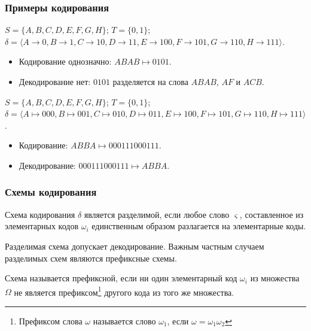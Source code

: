 \begin{frame}
    \frametitle{Примеры кодирования}

    \begin{example}
        $S=\{A,B,C,D,E,F,G,H\}$; $T=\{0,1\}$; $\delta=\langle A\to 0,B\to 1,C\to 10,D\to 11,E\to 100,F\to 101,G\to 110,H\to 111 \rangle$. 
        \begin{itemize}
            \item Кодирование однозначно: $ABAB\mapsto 0101$. 
            \item Декодирование нет: $0101$ разделяется на слова $ABAB$, $AF$ и $ACB$.
        \end{itemize}
    \end{example} 

    \begin{example}
        $S=\{A,B,C,D,E,F,G,H\}$; $T=\{0,1\}$; $\delta=\langle A\mapsto 000, B\mapsto 001, C\mapsto 010, D\mapsto 011, E\mapsto 100, F\mapsto 101, G\mapsto 110, H\mapsto 111 \rangle$.
        
        \begin{itemize}
            \item Кодирование: $ABBA\mapsto 000111000111$. 
            \item Декодирование: $000111000111\mapsto ABBA$.
        \end{itemize}
    \end{example} 
\end{frame}

\begin{frame}
    \frametitle{Схемы кодирования}

    \begin{definition}
        Схема кодирования $\delta$ является \alert{разделимой}, если любое слово $\varsigma$, составленное из элементарных кодов $\omega_i$ единственным образом разлагается на элементарные коды.
    \end{definition} 
    Разделимая схема допускает декодирование. Важным частным случаем \alert{разделимых} схем являются \alert{префиксные} схемы.
    \begin{definition}
        Схема называется \alert{префиксной}, если ни один элементарный код $\omega_i$ из множества $\Omega$ не является префиксом\footnote{Префиксом слова $\omega$ называется слово $\omega_1$, если $\omega=\omega_1\omega_2$} другого кода из того же множества.
    \end{definition} 
\end{frame}


